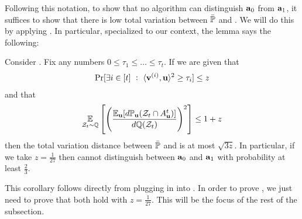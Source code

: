 Following this notation, to show that no algorithm can distinguish \(\boldsymbol{\mathrm{a}}_0\) from \(\boldsymbol{\mathrm{a}}_1\), it suffices to show that there is low total variation between \(\bar{{\mathbb P}}\) and \bbQ.
We will do this by applying .
In particular, specialized to our context, the lemma says the following:
\begin{corollary}
    \label{corol:l2-estimation-proof-goals}
    Consider .
    Fix any numbers \(0 \leq \tau_1 \leq \ldots \leq \tau_t\).
    If we are given that
    \begin{align}
        \Pr[\exists i \in [t] ~:~ \langle \boldsymbol{\mathrm{v}}^{(i)}, \boldsymbol{\mathrm{u}}\rangle^2 \geq \tau_i] \leq z
        \label{eqn:l2-truncation-rate}
    \end{align}
    and that
    \begin{align}
        \operatorname*{\mathbb{E}}_{{\mathcal Z}_t \sim {\mathbb Q}}\left[
            \left(\frac{
                \operatorname*{\mathbb{E}}_{\boldsymbol{\mathrm{u}}}[d{\mathbb P}_{\boldsymbol{\mathrm{u}}}({\mathcal Z}_t \cap A_{\boldsymbol{\mathrm{u}}}^{t})]
            }{
                d{\mathbb Q}({\mathcal Z}_t)
            }\right)^2
        \right]
        \leq 1+z
        \label{eqn:l2-estimation-divergence-rate}
    \end{align}
    then the total variation distance between \(\bar{{\mathbb P}}\) and \bbQ is at most \(\sqrt{3z}\).
    In particular, if we take \(z = \frac{1}{27}\) then \cA cannot distinguish between \(\boldsymbol{\mathrm{a}}_0\) and \(\boldsymbol{\mathrm{a}}_1\) with probability at least \(\frac23\).
\end{corollary}
This corollary follows directly from plugging in  into .
In order to prove , we just need to prove that both  hold with \(z = \frac1{27}\).
This will be the focus of the rest of the subsection.

